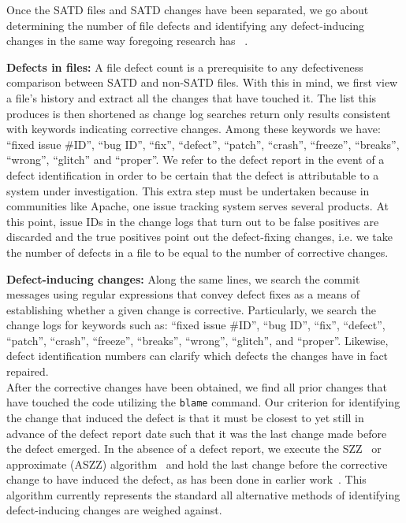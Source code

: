 Once the SATD files and SATD changes have been separated, we go about determining the number of file defects and identifying any defect-inducing changes in the same way foregoing research has ~\cite{Kamei-tse-2013, Kim-tse-2008, sliwerski-msr-2005}.

\noindent\textbf{Defects in files:}
A file defect count is a prerequisite to any defectiveness comparison between SATD and non-SATD files. With this in mind, we first view a file's history and extract all the changes that have touched it. The list this produces is then shortened as change log searches return only results consistent with keywords indicating corrective changes. Among these keywords we have: ``fixed issue \#ID'', ``bug ID'',  ``fix'',  ``defect'',  ``patch'', ``crash'',  ``freeze'', ``breaks'', ``wrong'', ``glitch'' and ``proper''. We refer to the defect report in the event of a defect identification in order to be certain that the defect is attributable to a system under investigation. This extra step must be undertaken because in communities like Apache, one issue tracking system serves several products.  At this point, issue IDs in the change logs that turn out to be false positives are discarded and the true positives point out the defect-fixing changes, i.e. we take the number of defects in a file to be equal to the number of corrective changes.

\noindent \textbf{Defect-inducing changes:}
Along the same lines, we search the commit messages using regular expressions that convey defect fixes as a means of establishing whether a given change is corrective. Particularly, we search the change logs for keywords such as: ``fixed issue \#ID'', ``bug ID'',  ``fix'',  ``defect'',  ``patch'', ``crash'',  ``freeze'', ``breaks'', ``wrong'', ``glitch'', and ``proper''. Likewise, defect identification numbers can clarify which defects the changes have in fact repaired.\\

After the corrective changes have been obtained, we find all prior changes that have touched the code utilizing the \texttt{blame} command. Our criterion for identifying the change that induced the defect is that it must be closest to yet still in advance of the defect report date such that it was the last change made before the defect emerged. In the absence of a defect report, we execute the SZZ~\cite{sliwerski-msr-2005} or approximate (ASZZ) algorithm~\cite{Kamei-tse-2013} and hold the last change before the corrective change to have induced the defect, as has been done in earlier work~\cite{Kamei-tse-2013}. This algorithm currently represents the standard all alternative methods of identifying defect-inducing changes are weighed against.

